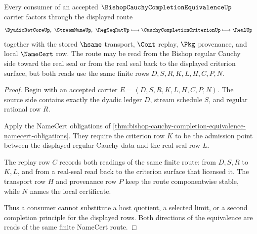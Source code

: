 \begin{theorem}
\label{thm:bishop-cauchy-completion-equivalence-route}
Every consumer of an accepted $\BishopCauchyCompletionEquivalenceUp$ carrier factors through the displayed route
$$
\DyadicRatCoreUp,\ \StreamNameUp,\ \RegSeqRatUp \longmapsto \CauchyCompletionCriterionUp \longmapsto \RealUp
$$
together with the stored $\hsame$ transport, $\Cont$ replay, $\Pkg$ provenance, and local $\NameCert$ row. The route may be read from the Bishop regular Cauchy side toward the real seal or from the real seal back to the displayed criterion surface, but both reads use the same finite rows $D,S,R,K,L,H,C,P,N$.
\end{theorem}
\begin{proof}
Begin with an accepted carrier $E=(D,S,R,K,L,H,C,P,N)$. The source side contains exactly the dyadic ledger $D$, stream schedule $S$, and regular rational row $R$.

Apply the NameCert obligations of \autoref{thm:bishop-cauchy-completion-equivalence-namecert-obligations}. They require the criterion row $K$ to be the admission point between the displayed regular Cauchy data and the real seal row $L$.

The replay row $C$ records both readings of the same finite route: from $D,S,R$ to $K,L$, and from a real-seal read back to the criterion surface that licensed it. The transport row $H$ and provenance row $P$ keep the route componentwise stable, while $N$ names the local certificate.

Thus a consumer cannot substitute a host quotient, a selected limit, or a second completion principle for the displayed rows. Both directions of the equivalence are reads of the same finite NameCert route.
\end{proof}

